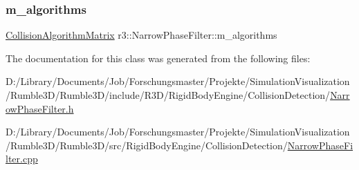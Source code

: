 \subsubsection{\texorpdfstring{m\+\_\+algorithms}{m\_algorithms}}
{\footnotesize\ttfamily \mbox{\hyperlink{classr3_1_1_collision_algorithm_matrix}{Collision\+Algorithm\+Matrix}} r3\+::\+Narrow\+Phase\+Filter\+::m\+\_\+algorithms\hspace{0.3cm}{\ttfamily [protected]}}



The documentation for this class was generated from the following files\+:\begin{DoxyCompactItemize}
\item 
D\+:/\+Library/\+Documents/\+Job/\+Forschungsmaster/\+Projekte/\+Simulation\+Visualization/\+Rumble3\+D/\+Rumble3\+D/include/\+R3\+D/\+Rigid\+Body\+Engine/\+Collision\+Detection/\mbox{\hyperlink{_narrow_phase_filter_8h}{Narrow\+Phase\+Filter.\+h}}\item 
D\+:/\+Library/\+Documents/\+Job/\+Forschungsmaster/\+Projekte/\+Simulation\+Visualization/\+Rumble3\+D/\+Rumble3\+D/src/\+Rigid\+Body\+Engine/\+Collision\+Detection/\mbox{\hyperlink{_narrow_phase_filter_8cpp}{Narrow\+Phase\+Filter.\+cpp}}\end{DoxyCompactItemize}
